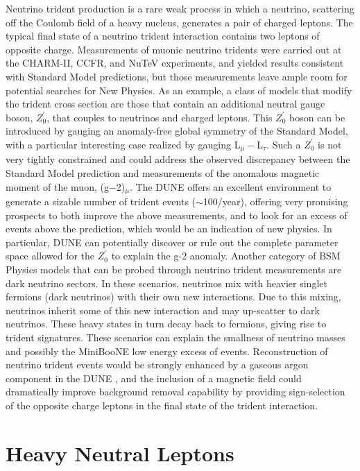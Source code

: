 Neutrino trident production is a rare weak process in which a neutrino, scattering off the Coulomb field of a heavy nucleus, generates a pair of charged leptons. The typical final state of a neutrino trident interaction contains two leptons of opposite charge.
Measurements of muonic neutrino tridents were carried out at the CHARM-II, CCFR, and NuTeV experiments, and yielded results consistent with Standard Model predictions, but those measurements leave ample room for potential searches for New Physics. As an example, a class of models that modify the trident cross section are those that contain an additional neutral gauge boson, $Z^{\prime}_0$, that couples to neutrinos and charged leptons. This $Z^{\prime}_0$ boson can be introduced by gauging an anomaly-free global symmetry of the Standard Model, with a particular interesting case realized by gauging L$_{\mu} -$L$_{\tau}$. Such a $Z^{\prime}_0$ is not very tightly constrained and could address the observed discrepancy between the Standard Model prediction and measurements of the anomalous magnetic moment of the muon, (g$-$2)$_{\mu}$. The DUNE  offers an excellent environment to generate a sizable number of trident events ($\sim$100/year), offering very promising prospects to both improve the above measurements, and to look for an excess of events above the  prediction, which would be an indication of new physics. In particular, DUNE can potentially discover or rule out the complete parameter space allowed for the $Z^{\prime}_0$ to explain the g-2 anomaly. Another category of BSM Physics models that can be probed through neutrino trident measurements are dark neutrino sectors. In these scenarios,  neutrinos mix with heavier  singlet fermions (dark neutrinos) with their own new interactions. Due to this mixing, neutrinos inherit some of this new interaction and may up-scatter to dark neutrinos. These heavy states in turn decay back to  fermions, giving rise to trident signatures. These scenarios can explain the smallness of neutrino masses and possibly the MiniBooNE low energy excess of events. Reconstruction of neutrino trident events would be strongly enhanced by a gaseous argon component in the DUNE , and the inclusion of a magnetic field could dramatically  improve background removal capability by providing sign-selection of the opposite charge leptons in the final state of the trident interaction. 

\section{Heavy Neutral Leptons}
\label{ssec:exsum-nd-BSMappendix-HNleptons}

